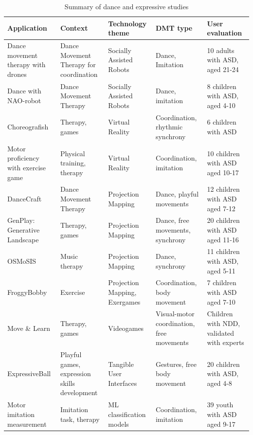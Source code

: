 \documentclass[a4paper,fleqn]{cas-sc}
\begin{document}
\begin{table}[h]
\centering
\begin{tabular}{p{}|p{}|p{}|p{}|p{}}
\hline
\textbf{Application} & \textbf{Context}  & \textbf{Technology theme} & \textbf{DMT type} & \textbf{User evaluation} \\ [0.5ex] 
 \hline
Dance movement therapy with drones \cite{Ascensao22} & Dance Movement Therapy for coordination & Socially Assisted Robots & Dance, Imitation & 10 adults with ASD, aged 21-24 \\
\hline
Dance with NAO-robot \cite{Suzuki17} & Dance Movement Therapy & Socially Assisted Robots & Dance, imitation & 8 children with ASD, aged 4-10\\
\hline
Choreografish \cite{AltizerJr18} & Therapy, games & Virtual Reality & Coordination, rhythmic synchrony & 6 children with ASD \\
\hline
Motor proficiency with exercise game \cite{Hocking22} & Physical training, therapy & Virtual Reality & Coordination, imitation & 10 children with ASD aged 10-17\\
\hline
DanceCraft \cite{Ringland19} & Dance Movement Therapy & Projection Mapping & Dance, playful movements & 12 children with ASD aged 7-12 \\
\hline
GenPlay: Generative Landscape \cite{Crowell18} & Therapy, games & Projection Mapping & Dance, free movements, synchrony & 20 children with ASD aged 11-16\\
\hline
OSMoSIS \cite{Ragone20, Osmosis20}  & Music therapy  & Projection Mapping & Dance, synchrony & 11 children with ASD, aged 5-11\\
\hline
FroggyBobby \cite{Caro17}  & Exercise & Projection Mapping, Exergames & Coordination, body movement & 7 children with ASD aged 7-10 \\ 
\hline
Move \& Learn \cite{Raygoza-Romero21} & Therapy, games & Videogames & Visual-motor coordination, free movements & Children with NDD, validated with experts \\
\hline
ExpressiveBall \cite{Wilson20} & Playful games, expression skills development & Tangible User Interfaces &  Gestures, free body movement & 20 children with ASD, aged 4-8 \\
\hline
Motor imitation measurement \cite{Zampella21} & Imitation task, therapy & ML classification models & Coordination, imitation & 39 youth with ASD aged 9-17 \\
\hline
\end{tabular}
\caption{Summary of dance and expressive studies}
\label{table:short-list}
\end{table}
\end{document}
